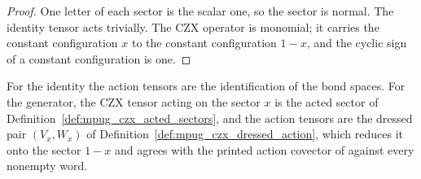 \begin{proof}\leanok
    One letter of each sector is the scalar one, so the sector is normal. The
    identity tensor acts trivially. The CZX operator is monomial; it carries
    the constant configuration $x$ to the constant configuration $1-x$, and
    the cyclic sign of a constant configuration is one.
\end{proof}

\begin{definition}
    \label{def:mpug_czx_block_action_data}
    \leanok
    For the identity the action tensors are the identification of the bond
    spaces. For the generator, the CZX tensor acting on the sector $x$ is the
    acted sector of Definition~\ref{def:mpug_czx_acted_sectors}, and the action
    tensors are the dressed pair $(V_x,W_x)$ of
    Definition~\ref{def:mpug_czx_dressed_action}, which reduces it onto the
    sector $1-x$ and agrees with the printed action covector of
    \cite[lines~4690--4694]{FrancoRubio2025MPUGauging} against every nonempty
    word.
\end{definition}

